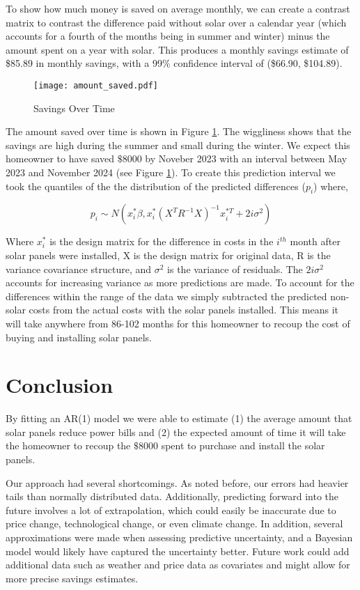 \documentclass{svproc}
\begin{document}
To show how much money is saved on average monthly, we can create a contrast matrix to contrast the difference paid without solar over a calendar year (which accounts for a fourth of the months being in summer and winter) minus the amount spent on a year with solar. This produces a monthly savings estimate of \$85.89 in monthly savings, with a 99\% confidence interval of (\$66.90, \$104.89).

\begin{figure}
\centering
\texttt{[image: amount\_saved.pdf]}
\caption{Savings Over Time}
\label{fig:savings}
\end{figure}

The amount saved over time is shown in Figure \ref{fig:savings}. The wiggliness shows that the savings are high during the summer and small during the winter. We expect this homeowner to have saved $\$8000$ by Noveber 2023 with an interval between May 2023 and November 2024 (see Figure \ref{fig:savings}). To create this prediction interval we took the quantiles of the the distribution of the predicted differences ($p_i$) where,

\begin{equation*}
p_i \sim N(x^*_i\beta, x^*_i(X^TR^{-1}X)^{-1}x^{*T}_i + 2i\sigma^2)
\end{equation*}

Where $x^*_i$ is the design matrix for the difference in costs in the $i^{th}$ month after solar panels were installed, X is the design matrix for original data, R is the variance covariance structure, and $\sigma^2$ is the variance of residuals. The $2i\sigma^2$ accounts for increasing variance as more predictions are made. To account for the differences within the range of the data we simply subtracted the predicted non-solar costs from the actual costs with the solar panels installed. 
This means it will take anywhere from 86-102 months for this homeowner to recoup the cost of buying and installing solar panels. 






\section{Conclusion}
By fitting an AR(1) model we were able to estimate (1) the average amount that solar panels reduce power bills  and (2) the expected amount of time it will take the homeowner to recoup the $\$8000$ spent to purchase and install the solar panels. 

Our approach had several shortcomings. As noted before, our errors had heavier tails than normally distributed data. Additionally, predicting forward into the future involves a lot of extrapolation, which could easily be inaccurate due to price change, technological change, or even climate change. In addition, several approximations were made when assessing predictive uncertainty, and a Bayesian model would likely have captured the uncertainty better. Future work  could add additional data such as weather and price data as covariates and might allow for more precise savings estimates.
\end{document}
